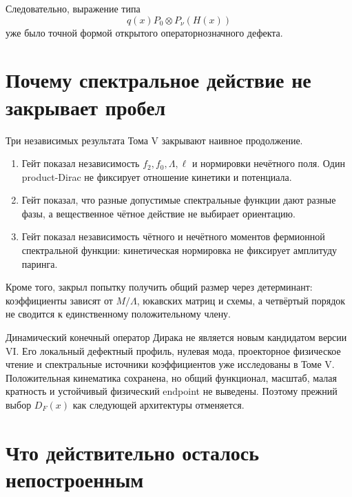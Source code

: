 Следовательно, выражение типа
\begin{equation}
 q(x)P_0\otimes P_\nu(H(x))
 \label{eq:v6-retrospective-operator-defect}
\end{equation}
уже было точной формой открытого операторнозначного дефекта.

\section{Почему спектральное действие не закрывает пробел}

Три независимых результата Тома V закрывают наивное продолжение.

\begin{enumerate}
 \item Гейт
 показал независимость $f_2,f_0,\Lambda,\ell$ и нормировки нечётного поля.
 Один product-Dirac не фиксирует отношение кинетики и потенциала.
 \item Гейт
 показал, что разные допустимые спектральные функции дают разные фазы, а
 вещественное чётное действие не выбирает ориентацию.
 \item Гейт
 показал независимость чётного и нечётного моментов фермионной спектральной
 функции: кинетическая нормировка не фиксирует амплитуду паринга.
\end{enumerate}

Кроме того,
закрыл попытку получить общий размер через детерминант: коэффициенты
зависят от $M/\Lambda$, юкавских матриц и схемы, а четвёртый порядок не
сводится к единственному положительному члену.

\begin{theorem}
Динамический конечный оператор Дирака не является новым кандидатом версии
VI. Его локальный дефектный профиль, нулевая мода, проекторное физическое
чтение и спектральные источники коэффициентов уже исследованы в Томе V.
Положительная кинематика сохранена, но общий функционал, масштаб, малая
кратность и устойчивый физический endpoint не выведены. Поэтому прежний
выбор $D_F(x)$ как следующей архитектуры отменяется.
\end{theorem}

\section{Что действительно осталось непостроенным}

